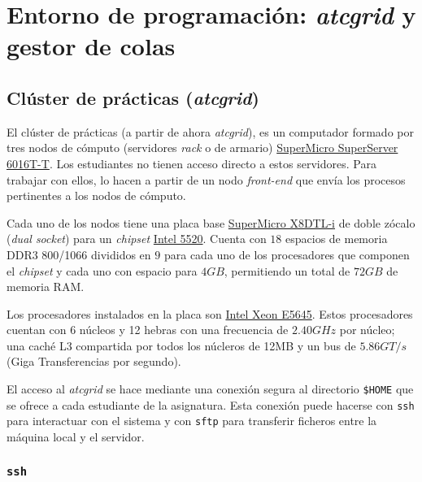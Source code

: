 \chapter{Entorno de programación: \textit{atcgrid} y gestor de colas}

\section{Clúster de prácticas (\textit{atcgrid})}

El clúster de prácticas (a partir de ahora \textit{atcgrid}), es un computador formado por tres nodos de cómputo (servidores \textit{rack} o de armario) \href{https://www.supermicro.com/products/system/1U/6016/SYS-6016T-T.cfm}{SuperMicro SuperServer 6016T-T}.
Los estudiantes no tienen acceso directo a estos servidores.
Para trabajar con ellos, lo hacen a partir de un nodo \textit{front-end} que envía los procesos pertinentes a los nodos de cómputo.

Cada uno de los nodos tiene una placa base \href{www.supermicro.com/products/motherboard/QPI/5500/X8DTL-i.cfm}{SuperMicro X8DTL-i} de doble zócalo (\textit{dual socket}) para un \textit{chipset} \href{https://www.intel.com/content/www/us/en/design/products-and-solutions/processors-and-chipsets/tylersburg/technical-library.html}{Intel 5520}.
Cuenta con $18$ espacios de memoria DDR3 800/1066 divididos en $9$ para cada uno de los procesadores que componen el \textit{chipset} y cada uno con espacio para $4GB$, permitiendo un total de $72GB$ de memoria RAM\@.

Los procesadores instalados en la placa son \href{https://ark.intel.com/content/www/us/en/ark/products/48768/intel-xeon-processor-e5645-12m-cache-2-40-ghz-5-86-gt-s-intel-qpi.html}{Intel Xeon E5645}.
Estos procesadores cuentan con 6 núcleos y 12 hebras con una frecuencia de $2.40GHz$ por núcleo; una caché L3 compartida por todos los núcleros de 12MB y un bus de $5.86GT/s$ (Giga Transferencias por segundo).

El acceso al \textit{atcgrid} se hace mediante una conexión segura al directorio \texttt{\$HOME} que se ofrece a cada estudiante de la asignatura.
Esta conexión puede hacerse con \texttt{ssh} para interactuar con el sistema y con \texttt{sftp} para transferir ficheros entre la máquina local y el servidor.

\subsection{\texttt{ssh}}

